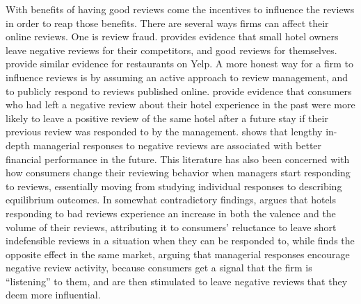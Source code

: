 \documentclass[12pt,pagebackref]{article}
\begin{document}
With benefits of having good reviews come the incentives to influence
the reviews in order to reap those benefits. There are several ways
firms can affect their online reviews. One is review fraud.
\citet{Mayzlin14} provides evidence that small hotel owners leave
negative reviews for their competitors, and good reviews for themselves.
\citet{LucaZervas16} provide similar evidence for restaurants on Yelp. A
more honest way for a firm to influence reviews is by assuming an active
approach to review management, and to publicly respond to reviews
published online. \citet{GuYe14} provide evidence that consumers who had
left a negative review about their hotel experience in the past were
more likely to leave a positive review of the same hotel after a future
stay if their previous review was responded to by the management.
\citet{XieEtAl17} shows that lengthy in-depth managerial responses to
negative reviews are associated with better financial performance in the
future. This literature has also been concerned with how consumers
change their reviewing behavior when managers start responding to
reviews, essentially moving from studying individual responses to
describing equilibrium outcomes. In somewhat contradictory findings,
\citet{ProserpioZervas17} argues that hotels responding to bad reviews
experience an increase in both the valence and the volume of their
reviews, attributing it to consumers' reluctance to leave short
indefensible reviews in a situation when they can be responded to, while
\citet{ChevalierEtAl18} finds the opposite effect in the same market,
arguing that managerial responses encourage negative review activity,
because consumers get a signal that the firm is ``listening'' to them,
and are then stimulated to leave negative reviews that they deem more
influential.
\end{document}
